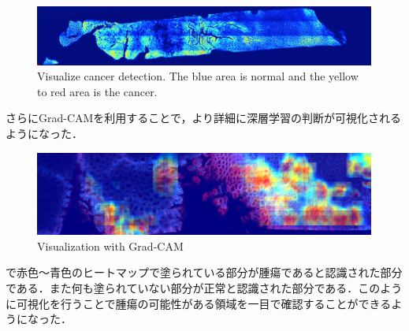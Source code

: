 \begin{figure}[H]
	\centering
	\includegraphics[width=\linewidth]{fig/chapter4/visualization/sample_B}
	\caption{Visualize cancer detection. The blue area is normal and the yellow to red area is the cancer.}
	\label{fig:cancer_detect_sampleB}
\end{figure}

さらにGrad-CAMを利用することで，より詳細に深層学習の判断が可視化されるようになった．

\begin{figure}[H]
	\centering
	\includegraphics[width=\linewidth]{fig/chapter4/large-grad-cam-step100-rm-black}
	\caption{Visualization with Grad-CAM}
	\label{fig:large-grad}
\end{figure}

で赤色〜青色のヒートマップで塗られている部分が腫瘍であると認識された部分である．また何も塗られていない部分が正常と認識された部分である．このように可視化を行うことで腫瘍の可能性がある領域を一目で確認することができるようになった．